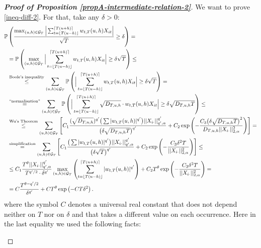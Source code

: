 \documentclass[a4paper,12pt]{article}
\begin{document}
\begin{proof}[\textnormal{\textbf{Proof of Proposition \ref{propA-intermediate-relation-2}}}]
We want to prove \eqref{ineq-diff-2}. For that, take any $\delta>0$:
\begin{align*}
\mathbb{P} &\left(\frac{\max_{(u, h) \in \mathcal{G}_T} \Big| \sum_{t=\lfloor T(u-h) \rfloor}^{\lceil T(u+h) \rceil} w_{t,T}(u,h)X_{it}  \Big|}{\sqrt{T}} \geq \delta \right) =\\
&=\mathbb{P}\left(\max_{(u, h) \in \mathcal{G}_T} \Big| \sum_{t=\lfloor T(u-h) \rfloor}^{\lceil T(u+h) \rceil} w_{t,T}(u,h)X_{it}  \Big| \geq \delta \sqrt{T} \right) \leq \\
&\overset{\text{Boole's inequality}}{\leq} \sum_{(u, h) \in \mathcal{G}_T} \mathbb{P} \left( \Big| \sum_{t=\lfloor T(u-h) \rfloor}^{\lceil T(u+h) \rceil} w_{t,T}(u,h)X_{it}  \Big| \geq \delta \sqrt{T} \right) = \\
&\overset{\text{``normalisation''}}{=} \sum_{(u, h) \in \mathcal{G}_T} \mathbb{P} \left( \Big| \sum_{t=\lfloor T(u-h) \rfloor}^{\lceil T(u+h) \rceil} \sqrt{D_{T, u, h}}\cdot w_{t,T}(u,h)X_{it}  \Big| \geq \delta\sqrt{D_{T, u, h}T}  \right) \leq \\
&\overset{\text{Wu's Theorem}}{\leq} \sum_{(u, h) \in \mathcal{G}_T} \left[C_1 \frac{(\sqrt{D_{T, u, h}})^{q^\prime}\big( \sum |w_{t,T}(u,h)|^{q^\prime}\big) ||X_{i\cdot}||^{q^\prime}_{q^\prime, \alpha}}{ \big(\delta\sqrt{D_{T, u, h}T}\big)^{q^\prime}} + C_2 \exp \left(-\frac{C_3 \big(\delta\sqrt{D_{T, u, h}T}\big)^2}{D_{T, u, h}||X_{i\cdot}||^{2}_{2, \alpha}}\right) \right] =\\
&\overset{\text{simplification}}{=} \sum_{(u, h) \in \mathcal{G}_T} \left[C_1 \frac{\big( \sum |w_{t,T}(u,h)|^{q^\prime}\big) ||X_{i\cdot}||^{q^\prime}_{q^\prime, \alpha}}{ \big(\delta \sqrt{T}\big)^{q^\prime}} + C_2 \exp \left(-\frac{C_3 \delta^2 T }{||X_{i\cdot}||^{2}_{2, \alpha}}\right) \right] \leq\\
&\leq C_1 \frac{ T^\theta ||X_{i\cdot}||^{q^\prime}_{q^\prime, \alpha}}{T^{q^\prime/2}\cdot \delta^{q^\prime}} \max_{(u, h) \in \mathcal{G}_T} \left( \sum_{t=\lfloor T(u-h) \rfloor}^{\lceil T(u+h) \rceil} |w_{t,T}(u,h)|^{q^\prime}\right)+ C_2 T^\theta \exp \left(-\frac{C_3 \delta^2 T}{||X_{i\cdot}||^{2}_{2, \alpha}}\right) = \\
&= C \frac{ T^{\theta - q^\prime/2}}{\delta^{q^\prime}} + C T^\theta \exp \left(-C T \delta^2\right).
\end{align*}
where the symbol $C$ denotes a universal real constant that does not depend neither on $T$ nor on $\delta$ and that takes a different value on each occurrence. Here in the last equality we used the following facts:
\begin{enumerate}

\end{enumerate}
\end{proof}
\end{document}
